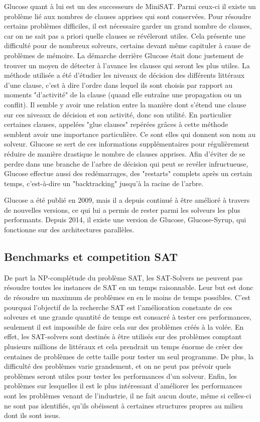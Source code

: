 \documentclass[a4paper,11pt]{article}
\begin{document}
Glucose quant à lui est un des successeurs de MiniSAT. Parmi ceux-ci il existe un problème lié aux nombres de clauses apprises qui sont conservées. Pour résoudre certains problèmes difficiles, il est nécessaire garder un 
grand nombre de clauses, car on ne sait pas a priori quelle clauses se révéleront utiles. Cela présente une difficulté pour de nombreux solveurs, certains devant même capituler à cause de problèmes de mémoire. La 
démarche derrière Glucose était donc justement de trouver un moyen de détecter à l'avance les clauses qui seront les plus utiles. La méthode utilisée a été d'étudier les niveaux de décision des différents littéraux 
d'une clause, c'est à dire l'ordre dans lequel ils sont choisis par rapport au moments "d'activité" de la clause (quand elle entraîne une propagation ou un conflit). Il semble y avoir une relation entre la manière 
dont s'étend une clause sur ces niveaux de décision et son activité, donc son utilité. En particulier certaines clauses, appelées "glue clauses" repérées grâces à cette méthode semblent avoir une importance particulière. 
Ce sont elles qui donnent son nom au solveur. Glucose se sert de ces informations supplémentaires pour régulièrement réduire de manière drastique le nombre de clauses apprises. 
Afin d'éviter de se perdre dans une branche de l'arbre de décision qui peut se revéler infructueuse, Glucose effectue aussi des redémarrages, des "restarts" complets après un certain temps, c'est-à-dire un 
"backtracking" jusqu'à la racine de l'arbre.

Glucose a été publié en 2009, mais il a depuis continué à être amélioré à travers de nouvelles versions, ce qui lui a permis de rester parmi les solveurs les plus performants. Depuis 2014, il existe une version 
de Glucose, Glucose-Syrup, qui fonctionne sur des architectures parallèles.

\subsection{Benchmarks et competition SAT}

De part la NP-complétude du problème SAT, les SAT-Solvers ne peuvent pas résoudre toutes les instances de SAT en un temps raisonnable. Leur but est donc de résoudre un maximum de problèmes en en le moins de 
temps possibles. C'est pourquoi l'objectif de la recherche SAT est l'amélioration constante de ces solveurs et une grande quantité de temps est consacré à tester ces performances, seulement il est impossible 
de faire cela sur des problèmes créés à la volée. En effet, les SAT-solvers sont destinés à être utilisés sur des problèmes comptant plusieurs millions de littéraux et cela prendrait un temps énorme de créer 
des centaines de problèmes de cette taille pour tester un seul programme. De plus, la difficulté des problèmes varie grandement, et on ne peut pas prévoir quels problèmes seront utiles pour tester les performances 
d'un solveur. Enfin, les problèmes sur lesquelles il est le plus intéressant d'améliorer les performances sont les problèmes venant de l'industrie, il ne fait aucun doute, même si celles-ci ne sont pas identifiés,
qu'ils obéissent à certaines structures propres au milieu dont ils sont issus. 
\end{document}
